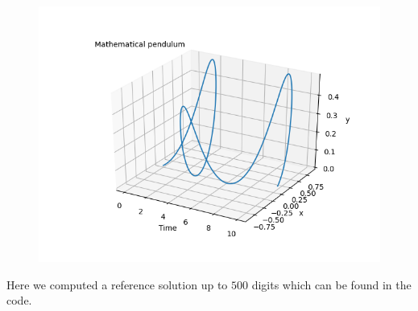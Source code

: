 \begin{figure}[H]
\centering
\includegraphics[scale=0.6]{../results/trajectories/mathematical_pendulum_trajectory.png}
\end{figure}

Here we computed a reference solution up to \(500\) digits which can be found in the code.\\

